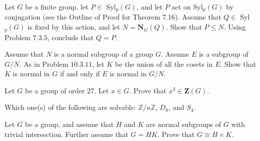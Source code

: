 \documentclass[12pt,letterpaper,boxed]{hmcpset}
\begin{document}

\begin{problem}[7.3.7]
Let $G$ be a finite group, let $P \in$ Syl$_p(G)$, and let $P$ act on Syl$_p(G)$ by conjugation (see the Outline of Proof for Theorem 7.16). Assume that $Q \in$ Syl$_p(G)$ is fixed by this action, and let $N = \textbf{N}_G(Q)$. Show that $P \leq N$. Using Problem $\textit{7.3.5}$, conclude that $Q = P$.
\end{problem}

\begin{solution}
\end{solution}

\clearpage

\begin{problem}[10.3.12]
Assume that $N$ is a normal subgroup of a group $G$. Assume $E$ is a subgroup of $G/N$. As in Problem $\textit{10.3.11}$, let $K$ be the union of all the cosets in $E$. Show that $K$ is normal in $G$ if and only if $E$ is normal in $G/N$.
\end{problem}

\begin{solution}
\end{solution}

\clearpage

\begin{problem}[10.3.14]
Let $G$ be a group of order 27. Let $x \in G$. Prove that $x^3 \in \textbf{Z}(G)$.
\end{problem}

\begin{solution}
\end{solution}

\clearpage

\begin{problem}[10.4.2]
Which one(s) of the following are solvable: $\mathbb{Z}/n\mathbb{Z}$, $D_8$, and $S_4$.
\end{problem}

\begin{solution}
\end{solution}

\clearpage

\begin{problem}[11.1.12]
Let $G$ be a group, and assume that $H$ and $K$ are normal subgroups of $G$ with trivial intersection. Further assume that $G=HK$. Prove that $G \cong H \times K$.
\end{problem}

\begin{solution}

\end{solution}
\end{document}

